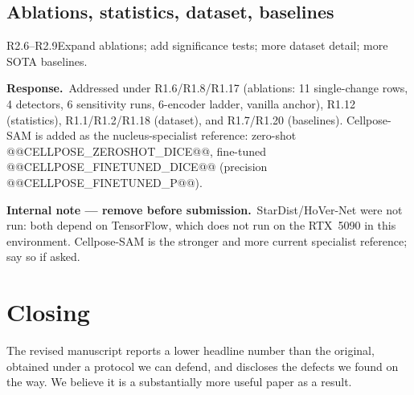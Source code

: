 \documentclass[11pt]{article}
\newif\ifinternal \internaltrue
\newcommand{\response}{\par\medskip\noindent\textbf{\color{bblue}Response.}\ }
\newcommand{\internalnote}[1]{\ifinternal\begin{tcolorbox}[breakable,colback=notebg,colframe=notefr,boxrule=0.5pt,arc=2pt]\footnotesize\textbf{Internal note --- remove before submission.}\ #1\end{tcolorbox}\fi}
\begin{document}
\subsection*{Ablations, statistics, dataset, baselines}
\begin{rcomment}{R2.6--R2.9}Expand ablations; add significance tests; more dataset detail; more SOTA baselines.\end{rcomment}
\response Addressed under R1.6/R1.8/R1.17 (ablations: 11 single-change rows, 4 detectors, 6 sensitivity runs, 6-encoder ladder, vanilla anchor), R1.12 (statistics), R1.1/R1.2/R1.18 (dataset), and R1.7/R1.20 (baselines). Cellpose-SAM is added as the nucleus-specialist reference: zero-shot @@CELLPOSE_ZEROSHOT_DICE@@, fine-tuned @@CELLPOSE_FINETUNED_DICE@@ (precision @@CELLPOSE_FINETUNED_P@@). \internalnote{StarDist/HoVer-Net were not run: both depend on TensorFlow, which does not run on the RTX~5090 in this environment. Cellpose-SAM is the stronger and more current specialist reference; say so if asked.}

\section*{Closing}
The revised manuscript reports a lower headline number than the original, obtained under a protocol we can defend, and discloses the defects we found on the way. We believe it is a substantially more useful paper as a result.
\end{document}
